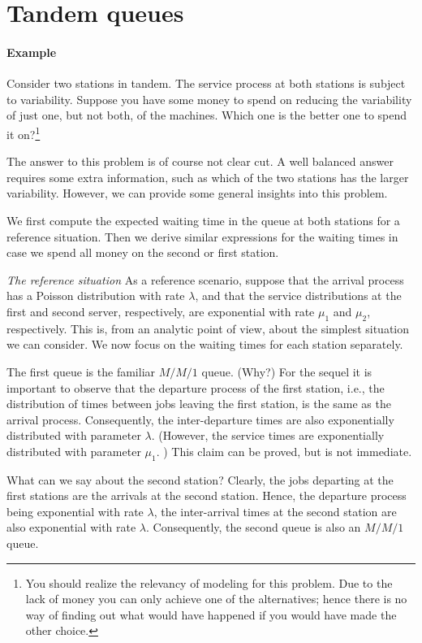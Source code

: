 
\section{Tandem queues}
\label{sec:tandem-queues}

\paragraph{Example}

Consider two stations in tandem. The service process at both stations
is subject to variability. Suppose you have some money to spend on
reducing the variability of just one, but not both, of the machines.
Which one is the better one to spend it on?\footnote{You should
  realize the relevancy of modeling for this problem. Due to the lack
  of money you can only achieve one of the alternatives; hence there
  is no way of finding out what would have happened if you would have
  made the other choice.}

The answer to this problem is of course not clear cut. A well balanced
answer requires some extra information, such as which of the two
stations has the larger variability. However, we can provide some
general insights into this problem.

We first compute the expected waiting time in the queue at both
stations for a  reference situation. Then we derive similar
expressions for the waiting times in case we spend all money on the
second or first station. 

\emph{The reference situation} As a reference scenario, suppose that
the arrival process has a Poisson distribution with rate $\lambda$,
and that the service distributions at the first and second server,
respectively, are exponential with rate $\mu_1$ and $\mu_2$,
respectively. This is, from an analytic point of view, about the
simplest situation we can consider.  We now focus on the waiting times
for each station separately.

The first queue is the familiar $M/M/1$ queue.  (Why?) For the sequel
it is important to observe that the departure process of the first
station, i.e., the distribution of times between jobs leaving the
first station, is the same as the arrival process. Consequently, the
inter-departure times are also exponentially distributed with parameter
$\lambda$. (However, the service times are exponentially distributed
with parameter $\mu_1$. ) This claim can be proved, but is not
immediate. 

What can we say about the second station?  Clearly, the jobs departing
at the first stations are the arrivals at the second station. Hence,
the departure process being exponential with rate $\lambda$, the
inter-arrival times at the second station are also exponential with
rate $\lambda$. Consequently, the second queue is also an $M/M/1$
queue.

